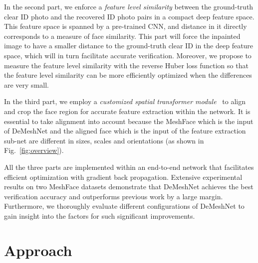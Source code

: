 \documentclass[10pt,twocolumn,letterpaper]{article}
\begin{document}
In the second part, we enforce a \textit{feature level similarity} between the ground-truth clear ID photo and the recovered ID photo pairs in a compact deep feature space. This feature space is spanned by a pre-trained CNN, and distance in it directly corresponds to a measure of face similarity. This part will force the inpainted image to have a smaller distance to the ground-truth clear ID in the deep feature space, which will in turn facilitate accurate verification. Moreover, we propose to measure the feature level similarity with the reverse Huber loss function so that the feature level similarity can be more efficiently optimized when the differences are very small.












In the third part, we employ a \textit{customized spatial transformer module}~\cite{jaderberg2015spatial} to align and crop the face region for accurate feature extraction within the network. It is essential to take alignment into account because the MeshFace which is the input of DeMeshNet and the aligned face which is the input of the feature extraction sub-net are different in sizes, scales and orientations (as shown in Fig.~\ref{fig:overview}).


All the three parts are implemented within an end-to-end network that facilitates efficient optimization with gradient back propagation. Extensive experimental results on two MeshFace datasets demonstrate that DeMeshNet achieves the best verification accuracy and outperforms previous work by a large margin.
Furthermore, we thoroughly evaluate different configurations of DeMeshNet to gain insight into the factors for such significant improvements.























\section{Approach}
\end{document}
